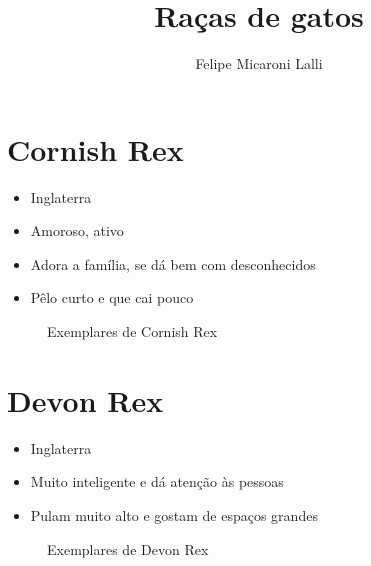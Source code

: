 \documentclass[a4paper]{article}
\title{Ra\c{c}as de gatos}
\author{Felipe Micaroni Lalli}
\begin{document}
  \maketitle

  \section{Cornish Rex}

  \begin{itemize}
    \item Inglaterra
    \item Amoroso, ativo
    \item Adora a fam\'ilia, se d\'a bem com desconhecidos
    \item P\^elo curto e que cai pouco
  \end{itemize}

  \begin{figure}[ht]
    \centering



    \caption{Exemplares de Cornish Rex}
    \label{fig:cornish-rex}
  \end{figure}
  
  \section{Devon Rex}

  \begin{itemize}
    \item Inglaterra
    \item Muito inteligente e d\'a aten\c{c}\~ao \`as pessoas
    \item Pulam muito alto e gostam de espa\c{c}os grandes
  \end{itemize}

  \begin{figure}[ht]
    \centering


    \caption{Exemplares de Devon Rex}
    \label{fig:devon-rex}
  \end{figure}
\end{document}
